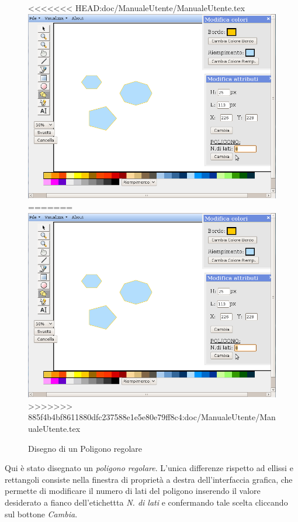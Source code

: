 \begin{figure}[!ht]
\centering
<<<<<<< HEAD:doc/ManualeUtente/ManualeUtente.tex
\includegraphics[scale=0.4]{images/poligono.png}
=======
\includegraphics[scale=1]{images/poligono.png}
>>>>>>> 885f4b4bf8611880dfc237588e1e5e80e79ff8c4:doc/ManualeUtente/ManualeUtente.tex
\caption{Disegno di un Poligono regolare}
\end{figure} 

\vspace{300pt}
Qui \`e stato disegnato un \textit{poligono regolare}. L'unica differenze rispetto ad ellissi e rettangoli consiste nella finestra di propriet\`a a destra dell'interfaccia grafica, che permette di modificare il numero di lati del poligono inserendo il valore desiderato a fianco dell'etichettta \textit{N. di lati} e confermando tale scelta cliccando sul bottone \textit{Cambia}.

